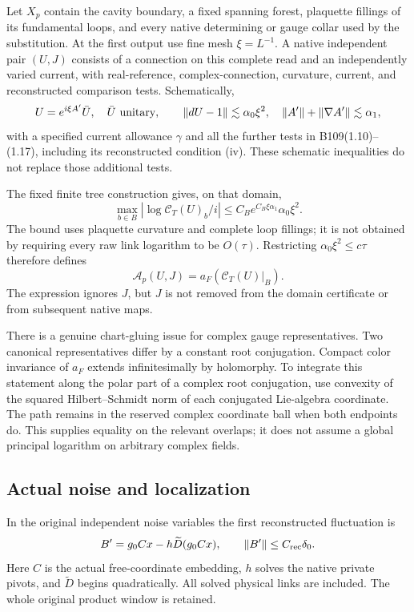 Let $X_p$ contain the cavity boundary, a fixed spanning forest, plaquette fillings of its fundamental loops, and every native determining or gauge collar used by the substitution. At the first output use fine mesh $\xi=L^{-1}$. A native independent pair $(U,J)$ consists of a connection on this complete read and an independently varied current, with real-reference, complex-connection, curvature, current, and reconstructed comparison tests. Schematically,
\[
 U=e^{i\xi A'}\bar U,\quad \bar U\text{ unitary},\qquad
 \left\lVert dU-1\right\rVert\lesssim\alpha_0\xi^2,\quad
 \left\lVert A'\right\rVert+\left\lVert \nabla A'\right\rVert\lesssim\alpha_1,
\]
with a specified current allowance $\gamma$ and all the further tests in B109(1.10)--(1.17), including its reconstructed condition (iv). These schematic inequalities do not replace those additional tests.

The fixed finite tree construction gives, on that domain,
\begin{equation}\label{eq:tree-pair-bound}
 \max_{b\in B}\left|\log\mathcal C_T(U)_b/i\right|
 \le C_Be^{C_B\xi\alpha_1}\alpha_0\xi^2.
\end{equation}
The bound uses plaquette curvature and complete loop fillings; it is not obtained by requiring every raw link logarithm to be $O(\tau)$. Restricting $\alpha_0\xi^2\le c\tau$ therefore defines
\begin{equation}\label{eq:pair-source}
 \mathcal A_p(U,J)=a_F(\mathcal C_T(U)|_B).
\end{equation}
The expression ignores $J$, but $J$ is not removed from the domain certificate or from subsequent native maps.

There is a genuine chart-gluing issue for complex gauge representatives. Two canonical representatives differ by a constant root conjugation. Compact color invariance of $a_F$ extends infinitesimally by holomorphy. To integrate this statement along the polar part of a complex root conjugation, use convexity of the squared Hilbert--Schmidt norm of each conjugated Lie-algebra coordinate. The path remains in the reserved complex coordinate ball when both endpoints do. This supplies equality on the relevant overlaps; it does not assume a global principal logarithm on arbitrary complex fields.

\subsection{Actual noise and localization}

In the original independent noise variables the first reconstructed fluctuation is
\begin{equation}\label{eq:actual-noise}
 B'=g_0Cx-h\widetilde D(g_0Cx),\qquad
 \left\lVert B'\right\rVert\le C_{\mathrm{rec}}\delta_0.
\end{equation}
Here $C$ is the actual free-coordinate embedding, $h$ solves the native private pivots, and $\widetilde D$ begins quadratically. All solved physical links are included. The whole original product window is retained.

